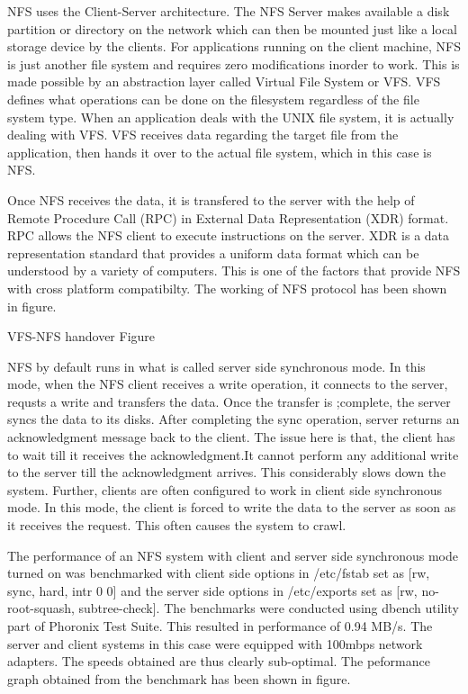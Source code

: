 \documentclass[conference]{IEEEtran}
\begin{document}
NFS uses the Client-Server architecture. The NFS Server makes available a
disk partition or directory on the network which can then be mounted just
like a local storage device by the clients. For applications running on the
client machine, NFS is just another file system and requires zero
modifications inorder to work. This is made possible by an abstraction
layer called Virtual File System or VFS. VFS defines what operations can be
done on the filesystem regardless of the file system type. When an
application deals with the UNIX file system, it is actually dealing with
VFS. VFS receives data regarding the target file from the application, then
hands it over to the actual file system, which in this case is NFS.

Once NFS receives the data, it is transfered to the server with the help of
Remote Procedure Call (RPC) in External Data Representation (XDR) format.
RPC allows the NFS client to execute instructions on the server. XDR is a
data representation standard that provides a uniform data format which can
be understood by a variety of computers. This is one of the factors that
provide NFS with cross platform compatibilty. The working of NFS protocol
has been shown in figure.

VFS-NFS handover Figure

NFS by default runs in what is called server side synchronous mode. In this
mode, when the NFS client receives a write operation, it connects to the
server, requsts a write and transfers the data. Once the transfer is
;complete, the server syncs the data to its disks. After completing the sync
operation, server returns an acknowledgment message back to the client. The
issue here is that, the client has to wait till it receives the 
acknowledgment.It cannot perform any additional write to the server till the
acknowledgment arrives. This considerably slows down the system. Further,
clients are often configured to work in client side synchronous mode.
In this mode, the client is forced to write the data to the server as
soon as it receives the request. This often causes the system to crawl.

The performance of an NFS system with client and server side synchronous
mode turned on was benchmarked with client side options in /etc/fstab set as
[rw, sync, hard, intr 0 0] and the server side options  in /etc/exports set
as [rw, no-root-squash, subtree-check]. The benchmarks were conducted using
dbench utility part of Phoronix Test Suite. This resulted in performance of
0.94 MB/s. The server and client systems in this case were equipped with
100mbps network adapters. The speeds obtained are thus clearly sub-optimal.
The peformance graph obtained from the benchmark has been shown in figure.
\end{document}
